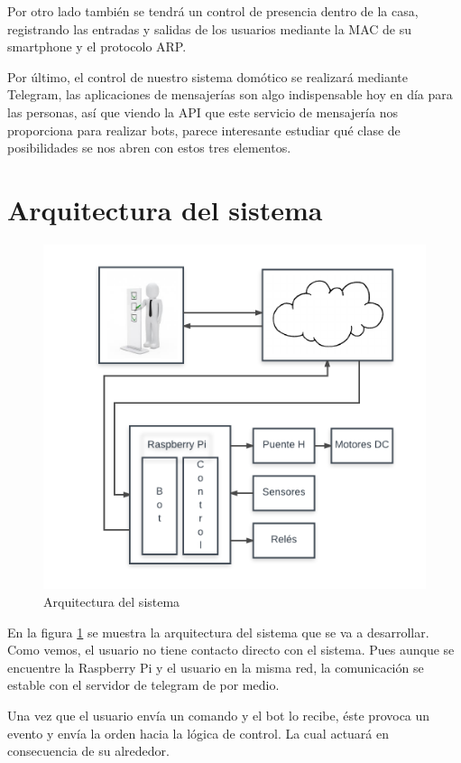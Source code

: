 \documentclass[10pt,journal,compsoc]{IEEEtran}
\begin{document}
Por otro lado también se tendrá un control de presencia dentro de la casa, registrando las entradas y salidas de los usuarios mediante la MAC de su smartphone y el protocolo ARP. 

Por último, el control de nuestro sistema domótico se realizará mediante Telegram, las aplicaciones de mensajerías son algo indispensable hoy en día para las personas, así que viendo la API que este servicio de mensajería nos proporciona para realizar bots, parece interesante estudiar qué clase de posibilidades se nos abren con estos tres elementos.

\section{Arquitectura del sistema}
\begin{figure}[h]
\centering
\includegraphics[scale=0.5]{ArqSist}
\caption{Arquitectura del sistema}
\label{fig:arqSist}
\end{figure}

En la figura \ref{fig:arqSist} se muestra la arquitectura del sistema que se va a desarrollar. Como vemos, el usuario no tiene contacto directo con el sistema. Pues aunque se encuentre la Raspberry Pi y el usuario en la misma red, la comunicación se estable con el servidor de telegram de por medio.

Una vez que el usuario envía un comando y el bot lo recibe, éste provoca un evento y envía la orden hacia la lógica de control. La cual actuará en consecuencia de su alrededor.
\end{document}
